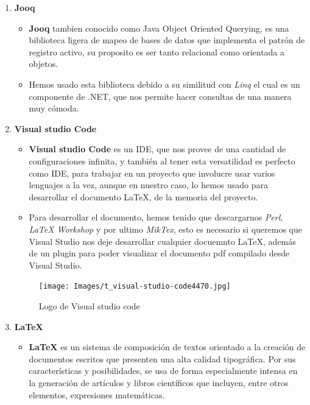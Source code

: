\documentclass[a4paper]{article}
\begin{document}
\begin{enumerate}
    \item \textbf{Jooq}
          \begin{itemize}
              \item \textbf{Jooq} tambien conocido como Java Object Oriented Querying, es una biblioteca ligera de mapeo de bases de datos que implementa el patrón de registro activo, su proposito es ser tanto relacional como orientada a objetos.
              \item Hemos usado esta biblioteca debido a su similitud con \textit{Linq} el cual es un componente de .NET, que nos permite hacer consultas de una manera muy cómoda.
          \end{itemize}
    \item \textbf{Visual studio Code}
          \begin{itemize}
              \item \textbf{Visual studio Code} es un IDE, que nos provee de una cantidad de configuraciones infinita, y también al tener esta versatilidad es perfecto como IDE, para trabajar en un proyecto que involucre usar varios lenguajes a la vez, aunque en nuestro caso, lo hemos usado para desarrollar el documento \LaTeX, de la memoria del proyecto.
              \item Para desarrollar el documento, hemos tenido que descargarnos \textit{Perl}, \textit{LaTeX Workshop} y por ultimo \textit{MikTex}, esto es necesario si queremos que Visual Studio nos deje desarrollar cualquier docuemnto \LaTeX, además de un plugin para poder visualizar el documento pdf compilado desde Visual Studio.
          \end{itemize}
          \begin{figure}[h]
            \centering
            \texttt{[image: Images/t\_visual-studio-code4470.jpg]} %
            \caption{Logo de Visual studio code}
            \label{fig:visualstudio}
        \end{figure}
    \item \textbf{\LaTeX}
          \begin{itemize}
              \item \textbf{\LaTeX} es un sistema de composición de textos orientado a la creación de documentos escritos que presenten una alta calidad tipográfica. Por sus características y posibilidades, se usa de forma especialmente intensa en la generación de artículos y libros científicos que incluyen, entre otros elementos, expresiones matemáticas.

\end{itemize}
\end{enumerate}
\end{document}
